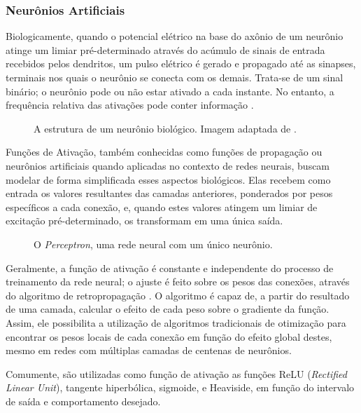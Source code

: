 \subsubsection{Neurônios Artificiais}

Biologicamente, quando o potencial elétrico na base do axônio de um neurônio atinge um limiar pré-determinado através do acúmulo de sinais de entrada recebidos pelos dendritos, um pulso elétrico é gerado e propagado até as sinapses, terminais nos quais o neurônio se conecta com os demais.
Trata-se de um sinal binário; o neurônio pode ou não estar ativado a cada instante. No entanto, a frequência relativa das ativações pode conter informação \cite{behnkeHierarchicalNeuralNetworks2003}.

\begin{figure}[H]
    \centering
    
    \caption{A estrutura de um neurônio biológico. Imagem adaptada de \cite{dhp1080IdoSkemoPri2016}.}
    \label{fig:bio_neuron}
\end{figure}

Funções de Ativação, também conhecidas como funções de propagação ou neurônios artificiais quando aplicadas no contexto de redes neurais, buscam modelar de forma simplificada esses aspectos biológicos.
Elas recebem como entrada os valores resultantes das camadas anteriores, ponderados por pesos específicos a cada conexão, e, quando estes valores atingem um limiar de excitação pré-determinado, os transformam em uma única saída.

\begin{figure}[H]
    \centering
    
    \caption{O \textit{Perceptron}, uma rede neural com um único neurônio.}
    \label{fig:perceptron}
\end{figure}

Geralmente, a função de ativação é constante e independente do processo de treinamento da rede neural; o ajuste é feito sobre os pesos das conexões, através do algoritmo de retropropagação \cite{dreyfusArtificialNeuralNetworks1990}.
O algoritmo é capaz de, a partir do resultado de uma camada, calcular o efeito de cada peso sobre o gradiente da função.
Assim, ele possibilita a utilização de algoritmos tradicionais de otimização para encontrar os pesos locais de cada conexão em função do efeito global destes, mesmo em redes com múltiplas camadas de centenas de neurônios.

Comumente, são utilizadas como função de ativação as funções ReLU (\textit{Rectified Linear Unit}), tangente hiperbólica, sigmoide, e Heaviside, em função do intervalo de saída e comportamento desejado.

